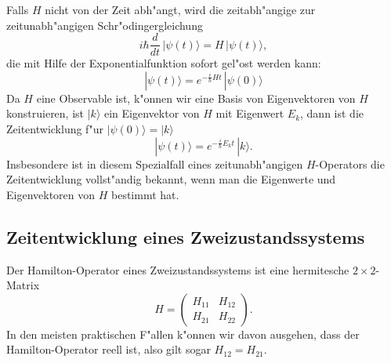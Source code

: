 Falls $H$ nicht von der Zeit abh"angt, wird die zeitabh"angige zur
zeitunabh"angigen Schr"odingergleichung
\begin{equation}
i\hbar \frac{d}{dt}\,|\psi(t)\rangle = H\,|\psi(t)\rangle,
\label{skript:schroedingergleichung}
\end{equation}
die mit Hilfe der Exponentialfunktion sofort gel"ost werden kann:
\[
|\psi(t)\rangle = e^{-\frac{i}{\hbar}H t}\,|\psi(0)\rangle
\]
Da $H$ eine Observable ist, k"onnen wir eine Basis von Eigenvektoren
von $H$ konstruieren, ist $|k\rangle$ ein Eigenvektor von $H$ mit
Eigenwert $E_k$, dann ist die Zeitentwicklung f"ur $|\psi(0)\rangle = |k\rangle$
\[
|\psi(t)\rangle
=
e^{-\frac{i}{\hbar}E_kt}\,|k\rangle.
\]
Insbesondere ist in diesem Spezialfall eines zeitunabh"angigen $H$-Operators
die Zeitentwicklung vollst"andig bekannt, wenn man die Eigenwerte und
Eigenvektoren von $H$ bestimmt hat.

%
%
\subsection{Zeitentwicklung eines Zweizustandssystems}
Der Hamilton-Operator eines Zweizustandssystems ist eine hermitesche
$2\times 2$-Matrix
\[
H=\begin{pmatrix}H_{11}&H_{12}\\H_{21}&H_{22}\end{pmatrix}.
\]
In den meisten praktischen F"allen k"onnen wir davon ausgehen, dass
der Hamilton-Operator reell ist, also gilt sogar $H_{12}=H_{21}$.

